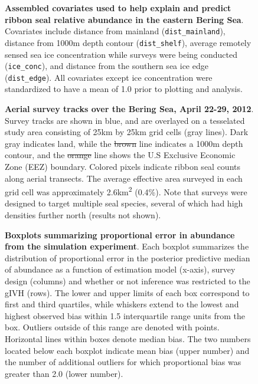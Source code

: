 \documentclass[10pt,letterpaper]{article}
\providecommand{\DIFadd}[1]{{\protect\color{blue}\uwave{#1}}} %
\providecommand{\DIFdel}[1]{{\protect\color{red}\sout{#1}}}                      %
\providecommand{\DIFaddFL}[1]{\DIFadd{#1}} %
\providecommand{\DIFdelFL}[1]{\DIFdel{#1}} %
\providecommand{\DIFaddbeginFL}{} %
\providecommand{\DIFaddendFL}{} %
\providecommand{\DIFdelbeginFL}{} %
\providecommand{\DIFdelendFL}{} %
\begin{document}
\begin{figure}[!h]
\caption{{\bf Assembled covariates used to help explain and predict ribbon seal relative abundance in the eastern Bering Sea}.  Covariates include distance from mainland (\texttt{dist\_mainland}), distance from 1000m depth contour (\texttt{dist\_shelf}), average remotely sensed sea ice concentration while surveys were being conducted (\texttt{ice\_conc}), and distance from the southern sea ice edge (\texttt{dist\_edge}).  All covariates except ice concentration were standardized to have a mean of 1.0 prior to plotting and analysis.
}
\label{fig:covs}
\end{figure}

\begin{figure}[!h]
\caption{{\bf Aerial survey tracks over the Bering Sea, April 22-29, 2012}. Survey tracks are shown in blue, and are overlayed on a tesselated study area consisting of 25km by 25km grid cells (gray lines).  Dark gray indicates land, while the \DIFdelbeginFL \DIFdelFL{brown }\DIFdelendFL \DIFaddbeginFL \DIFaddFL{orange dashed }\DIFaddendFL line indicates a 1000m depth contour, and the \DIFdelbeginFL \DIFdelFL{orange }\DIFdelendFL \DIFaddbeginFL \DIFaddFL{solid brown }\DIFaddendFL line shows the U.S Exclusive Economic Zone (EEZ) boundary. Colored pixels indicate ribbon seal counts along aerial transects. The average effective area surveyed in each grid cell was approximately 2.6km\textsuperscript{2} (0.4\%).  Note that surveys were designed to target multiple seal species, several of which had high densities further north (results not shown). }
\label{fig:flights}
\end{figure}

\begin{figure}[!h]
\caption{{\bf Boxplots summarizing proportional error in abundance from the simulation experiment}. Each boxplot summarizes the distribution of proportional error in the posterior predictive median of abundance as a function of estimation model (x-axis), survey design (columns) and whether or not inference was restricted to the gIVH (rows).  The lower and upper limits of each box correspond to first and third quartiles, while whiskers extend to the lowest and highest observed bias within 1.5 interquartile range units from the box.  Outliers outside of this range are denoted with points.  Horizontal lines within boxes denote median bias.  The two numbers located below each boxplot indicate mean bias (upper number) and the number of additional outliers for which proportional bias was greater than 2.0 (lower number). }
\label{fig:sim_boxplots}
\end{figure}
\end{document}

